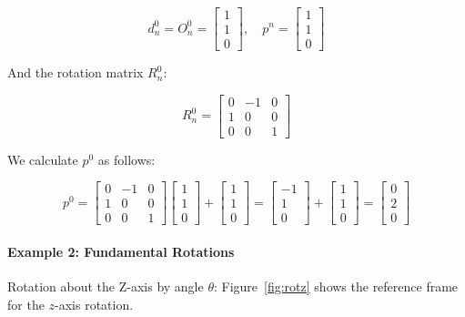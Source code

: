 \documentclass[../../master-handout.tex]{subfiles}
\begin{document}
\begin{fullwidth}
\[
d_n^0 = O_n^0 = \begin{bmatrix} 1 \\ 1 \\ 0 \end{bmatrix}, \quad p^n = \begin{bmatrix} 1 \\ 1 \\ 0 \end{bmatrix}
\]
\end{fullwidth}
And the rotation matrix $R_n^0$:
\begin{fullwidth}
\[
R_n^0 = \begin{bmatrix} 0 & -1 & 0 \\ 1 & 0 & 0 \\ 0 & 0 & 1 \end{bmatrix}
\]
\end{fullwidth}
We calculate $p^0$ as follows:
\begin{fullwidth}
\[
p^0 = \begin{bmatrix} 0 & -1 & 0 \\ 1 & 0 & 0 \\ 0 & 0 & 1 \end{bmatrix} \begin{bmatrix} 1 \\ 1 \\ 0 \end{bmatrix} + \begin{bmatrix} 1 \\ 1 \\ 0 \end{bmatrix}
= \begin{bmatrix} -1 \\ 1 \\ 0 \end{bmatrix} + \begin{bmatrix} 1 \\ 1 \\ 0 \end{bmatrix} = \begin{bmatrix} 0 \\ 2 \\ 0 \end{bmatrix}
\]
\end{fullwidth}

\paragraph{Example 2: Fundamental Rotations}
Rotation about the Z-axis by angle $\theta$:
Figure~\ref{fig:rotz} shows the reference frame for the $z$-axis rotation.
\end{document}
